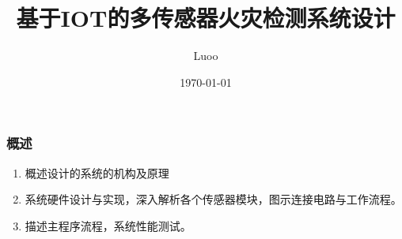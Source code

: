﻿\documentclass{beamer}
\title{基于IOT的多传感器火灾检测系统设计}
\author{Luoo}
\institute
{
  \inst{1}
  物理系~西安理工大学
  \and
  \inst{2}
   applied physics\\
  Xi'an University of Technology
}
\date{\today}
\begin{document}
\begin{frame}
  \titlepage
\end{frame}


\begin{frame}
  \frametitle{概述}
  \begin{enumerate}
    \item<1-> 概述设计的系统的机构及原理
    \item<2-> 系统硬件设计与实现，深入解析各个传感器模块，图示连接电路与工作流程。
    \item<3-> 描述主程序流程，系统性能测试。
  \end{enumerate}
\end{frame}
\end{document}
